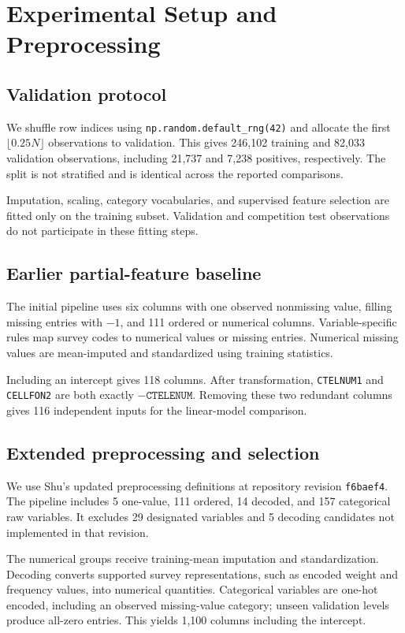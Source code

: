 \documentclass[10pt,conference,compsocconf]{IEEEtran}
\begin{document}
\section{Experimental Setup and Preprocessing}
\subsection{Validation protocol}
We shuffle row indices using
\texttt{np.random.default\_rng(42)} and allocate the first
$\lfloor0.25N\rfloor$ observations to validation. This gives
246,102 training and 82,033 validation observations, including
21,737 and 7,238 positives, respectively. The split is not
stratified and is identical across the reported comparisons.

Imputation, scaling, category vocabularies, and supervised
feature selection are fitted only on the training subset.
Validation and competition test observations do not
participate in these fitting steps.

\subsection{Earlier partial-feature baseline}
The initial pipeline uses six columns with one observed
nonmissing value, filling missing entries with $-1$, and
111 ordered or numerical columns. Variable-specific rules
map survey codes to numerical values or missing entries.
Numerical missing values are mean-imputed and standardized
using training statistics.

Including an intercept gives 118 columns. After transformation,
\texttt{CTELNUM1} and \texttt{CELLFON2} are both exactly
$-\texttt{CTELENUM}$. Removing these two redundant columns
gives 116 independent inputs for the linear-model comparison.

\subsection{Extended preprocessing and selection}
We use Shu's updated preprocessing definitions at repository
revision \texttt{f6baef4}. The pipeline includes 5 one-value,
111 ordered, 14 decoded, and 157 categorical raw variables.
It excludes 29 designated variables and 5 decoding candidates
not implemented in that revision.

The numerical groups receive training-mean imputation and
standardization. Decoding converts supported survey
representations, such as encoded weight and frequency
values, into numerical quantities. Categorical variables
are one-hot encoded, including an observed missing-value
category; unseen validation levels produce all-zero entries.
This yields 1,100 columns including the intercept.
\end{document}
